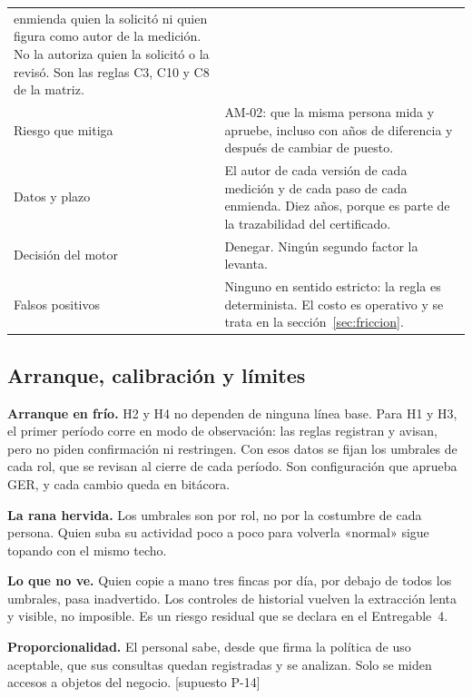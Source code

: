 \documentclass[11pt,letterpaper]{article}
\newcommand{\supu}[1]{\textrm{\footnotesize [supuesto #1]}}
\begin{document}
{\begin{longtable}{@{}L{2.5cm} L{13.2cm}@{}}
enmienda quien la solicitó ni quien figura como autor de la medición. No la autoriza quien la
solicitó o la revisó. Son las reglas C3, C10 y C8 de la matriz. \\
Riesgo que mitiga & AM-02: que la misma persona mida y apruebe, incluso con años de diferencia y
después de cambiar de puesto. \\
Datos y plazo & El autor de cada versión de cada medición y de cada paso de cada enmienda. Diez años,
porque es parte de la trazabilidad del certificado. \\
Decisión del motor & Denegar. Ningún segundo factor la levanta. \\
Falsos positivos & Ninguno en sentido estricto: la regla es determinista. El costo es operativo y se
trata en la sección~\ref{sec:friccion}. \\
\bottomrule
\end{longtable}
}

\subsection{Arranque, calibración y límites}

\textbf{Arranque en frío.} H2 y H4 no dependen de ninguna línea base. Para H1 y H3, el primer período
corre en modo de observación: las reglas registran y avisan, pero no piden confirmación ni
restringen. Con esos datos se fijan los umbrales de cada rol, que se revisan al cierre de cada
período. Son configuración que aprueba GER, y cada cambio queda en bitácora.

\textbf{La rana hervida.} Los umbrales son por rol, no por la costumbre de cada persona. Quien suba su
actividad poco a poco para volverla «normal» sigue topando con el mismo techo.

\textbf{Lo que no ve.} Quien copie a mano tres fincas por día, por debajo de todos los umbrales, pasa
inadvertido. Los controles de historial vuelven la extracción lenta y visible, no imposible. Es un
riesgo residual que se declara en el Entregable~4.

\textbf{Proporcionalidad.} El personal sabe, desde que firma la política de uso aceptable, que sus
consultas quedan registradas y se analizan. Solo se miden accesos a objetos del negocio. \supu{P-14}
\end{document}
